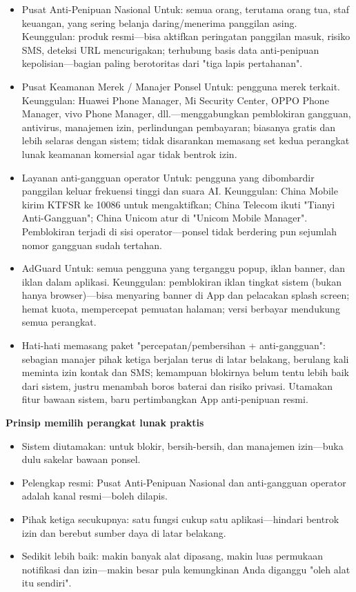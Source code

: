 \begin{itemize}
  \item Pusat Anti-Penipuan Nasional Untuk: semua orang, terutama orang tua, staf keuangan, yang sering belanja daring/menerima panggilan asing. Keunggulan: produk resmi—bisa aktifkan peringatan panggilan masuk, risiko SMS, deteksi URL mencurigakan; terhubung basis data anti-penipuan kepolisian—bagian paling berotoritas dari "tiga lapis pertahanan".
  \item Pusat Keamanan Merek / Manajer Ponsel Untuk: pengguna merek terkait. Keunggulan: Huawei Phone Manager, Mi Security Center, OPPO Phone Manager, vivo Phone Manager, dll.—menggabungkan pemblokiran gangguan, antivirus, manajemen izin, perlindungan pembayaran; biasanya gratis dan lebih selaras dengan sistem; tidak disarankan memasang set kedua perangkat lunak keamanan komersial agar tidak bentrok izin.
  \item Layanan anti-gangguan operator Untuk: pengguna yang dibombardir panggilan keluar frekuensi tinggi dan suara AI. Keunggulan: China Mobile kirim KTFSR ke 10086 untuk mengaktifkan; China Telecom ikuti "Tianyi Anti-Gangguan"; China Unicom atur di "Unicom Mobile Manager". Pemblokiran terjadi di sisi operator—ponsel tidak berdering pun sejumlah nomor gangguan sudah tertahan.
  \item AdGuard Untuk: semua pengguna yang terganggu popup, iklan banner, dan iklan dalam aplikasi. Keunggulan: pemblokiran iklan tingkat sistem (bukan hanya browser)—bisa menyaring banner di App dan pelacakan splash screen; hemat kuota, mempercepat pemuatan halaman; versi berbayar mendukung semua perangkat.
  \item Hati-hati memasang paket "percepatan/pembersihan + anti-gangguan": sebagian manajer pihak ketiga berjalan terus di latar belakang, berulang kali meminta izin kontak dan SMS; kemampuan blokirnya belum tentu lebih baik dari sistem, justru menambah boros baterai dan risiko privasi. Utamakan fitur bawaan sistem, baru pertimbangkan App anti-penipuan resmi.
\end{itemize}

\textbf{Prinsip memilih perangkat lunak praktis}\par

\begin{itemize}
  \item Sistem diutamakan: untuk blokir, bersih-bersih, dan manajemen izin—buka dulu sakelar bawaan ponsel.
  \item Pelengkap resmi: Pusat Anti-Penipuan Nasional dan anti-gangguan operator adalah kanal resmi—boleh dilapis.
  \item Pihak ketiga secukupnya: satu fungsi cukup satu aplikasi—hindari bentrok izin dan berebut sumber daya di latar belakang.
  \item Sedikit lebih baik: makin banyak alat dipasang, makin luas permukaan notifikasi dan izin—makin besar pula kemungkinan Anda diganggu "oleh alat itu sendiri".
\end{itemize}


